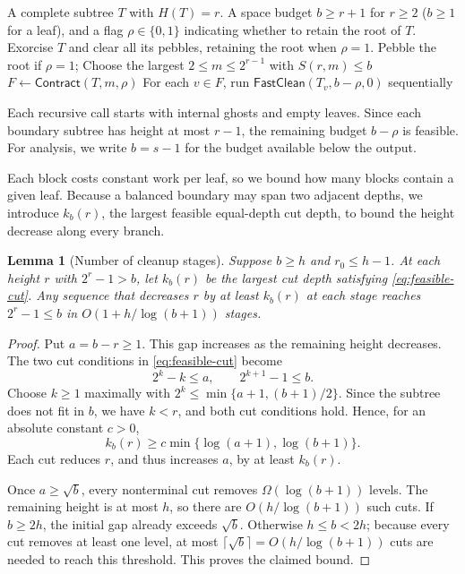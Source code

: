 \documentclass[11pt]{article}
\newtheorem{lemma}[lemma]{Lemma}
\theoremstyle{definition}
\theoremstyle{remark}
\newcommand{\Clean}{\mathsf{FastClean}}
\newcommand{\Contract}{\mathsf{Contract}}
\begin{document}
\begin{algorithm}[H]
\caption{Complete-tree block cleanup $\Clean(T,b,\rho)$}
\label{alg:seq-clean}
\begin{algorithmic}[1]
\Require A complete subtree $T$ with $H(T)=r$.
\Require A space budget $b\ge r+1$ for $r\ge2$ ($b\ge1$ for a leaf), and a flag $\rho\in\{0,1\}$ indicating whether to retain the root of $T$.
\Ensure Exorcise $T$ and clear all its pebbles, retaining the root when $\rho=1$.
 \State Pebble the root if $\rho=1$; \Return
\EndIf
\State Choose the largest $2\le m\le2^{r-1}$ with $S(r,m)\le b$
\State $F\gets\Contract(T,m,\rho)$
\State For each $v\in F$, run $\Clean(T_v,b-\rho,0)$ sequentially
\end{algorithmic}
\end{algorithm}

Each recursive call starts with internal ghosts and empty leaves. Since each boundary subtree has height at most $r-1$, the remaining budget $b-\rho$ is feasible. For analysis, we write $b=s-1$ for the budget available below the output.

Each block costs constant work per leaf, so we bound how many blocks contain a given leaf. Because a balanced boundary may span two adjacent depths, we introduce $k_b(r)$, the largest feasible equal-depth cut depth, to bound the height decrease along every branch.

\begin{lemma}[Number of cleanup stages]
\label{lem:slack}
Suppose $b\ge h$ and $r_0\le h-1$. At each height $r$ with $2^r-1>b$, let $k_b(r)$ be the largest cut depth satisfying \cref{eq:feasible-cut}. Any sequence that decreases $r$ by at least $k_b(r)$ at each stage reaches $2^r-1\le b$ in $O(1+h/\log(b+1))$ stages.
\end{lemma}
\begin{proof}
Put $a=b-r\ge1$. This gap increases as the remaining height decreases. The two cut conditions in \cref{eq:feasible-cut} become
\[
2^k-k\le a,\qquad 2^{k+1}-1\le b.
\]
Choose $k\ge1$ maximally with $2^k\le\min\{a+1,(b+1)/2\}$. Since the subtree does not fit in $b$, we have $k<r$, and both cut conditions hold. Hence, for an absolute constant $c>0$,
\[
 k_b(r)\ge c\min\{\log(a+1),\log(b+1)\}.
\]
Each cut reduces $r$, and thus increases $a$, by at least $k_b(r)$.

Once $a\ge\sqrt b$, every nonterminal cut removes $\Omega(\log(b+1))$ levels. The remaining height is at most $h$, so there are $O(h/\log(b+1))$ such cuts. If $b\ge2h$, the initial gap already exceeds $\sqrt b$. Otherwise $h\le b<2h$; because every cut removes at least one level, at most $\lceil\sqrt b\rceil=O(h/\log(b+1))$ cuts are needed to reach this threshold. This proves the claimed bound.
\end{proof}
\end{document}
